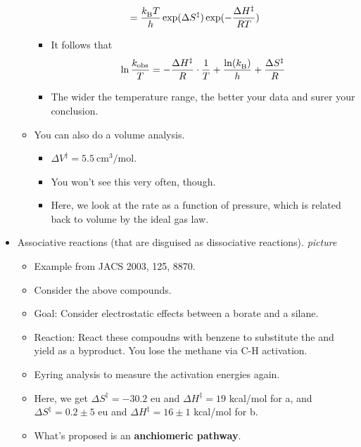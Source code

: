 \documentclass[../notes.tex]{subfiles}
\begin{document}
\begin{itemize}
\begin{itemize}
\begin{equation*}
            = \frac{{k_\text{B}^{}} T}{h}\exp(\Delta S^\ddagger)\exp(-\frac{\Delta H^\ddagger}{RT})
        \end{equation*}
        \begin{itemize}
            \item It follows that
            \begin{equation*}
                \ln\frac{k_\text{obs}}{T} = -\frac{\Delta H^\ddagger}{R}\cdot\frac{1}{T}+\frac{\ln({k_\text{B}^{}})}{h}+\frac{\Delta S^\ddagger}{R}
            \end{equation*}
            \item The wider the temperature range, the better your data and surer your conclusion.
        \end{itemize}
        \item You can also do a volume analysis.
        \begin{itemize}
            \item $\Delta V^\ddagger=\SI{5.5}{\centi\meter\cubed\per\mole}$.
            \item You won't see this very often, though.
            \item Here, we look at the rate as a function of pressure, which is related back to volume by the ideal gas law.
        \end{itemize}
    \end{itemize}
    \item Associative reactions (that are disguised as dissociative reactions).
    \emph{picture}
    \begin{itemize}
        \item Example from JACS 2003, 125, 8870.
        \item Consider the above compounds.
        \item Goal: Consider electrostatic effects between a borate and a silane.
        \item Reaction: React these compoudns with benzene to substitute the  and yield  as a byproduct. You lose the methane via C-H activation.
        \item Eyring analysis to measure the activation energies again.
        \item Here, we get $\Delta S^\ddagger=-30.2$ eu and $\Delta H^\ddagger=19$ kcal/mol for a, and $\Delta S^\ddagger=0.2\pm 5$ eu and $\Delta H^\ddagger=16\pm 1$ kcal/mol for b.
        \item What's proposed is an \textbf{anchiomeric pathway}.
    \end{itemize}

\end{itemize}
\end{document}
